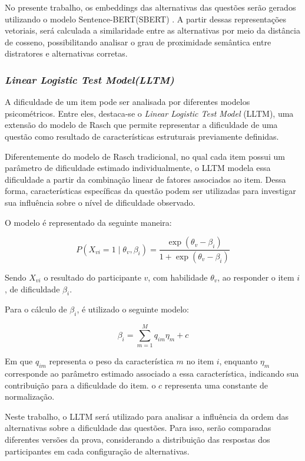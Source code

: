 \documentclass[a4paper,10pt, twocolumn]{article}
\begin{document}
No presente trabalho, os embeddings das alternativas das questões serão gerados utilizando o modelo Sentence-BERT(SBERT) \cite{reimers_sentence-bert_2019}. A partir dessas representações vetoriais, será calculada a similaridade entre as alternativas por meio da distância de cosseno, possibilitando analisar o grau de proximidade semântica entre distratores e alternativas corretas.

\subsubsection{\textit{Linear Logistic Test Model(LLTM)}}
A dificuldade de um item pode ser analisada por diferentes modelos psicométricos. Entre eles, destaca-se o \textit{Linear Logistic Test Model} (LLTM), uma extensão do modelo de Rasch que permite representar a dificuldade de uma questão como resultado de características estruturais previamente definidas. \cite{fischer_linear_1973}

Diferentemente do modelo de Rasch tradicional, no qual cada item possui um parâmetro de dificuldade estimado individualmente, o LLTM modela essa dificuldade a partir da combinação linear de fatores associados ao item. Dessa forma, características específicas da questão podem ser utilizadas para investigar sua influência sobre o nível de dificuldade observado.

O modelo é representado da seguinte maneira:

\[
P(X_{vi} = 1 \mid \theta_v, \beta_i) =
\frac{\exp(\theta_v - \beta_i)}
{1 + \exp(\theta_v - \beta_i)}
\]

Sendo $X_{vi}$ o resultado do participante $v$, com habilidade $\theta_v$, ao responder o item $i$, de dificuldade $\beta_i$.

Para o cálculo de $\beta_i$, é utilizado o seguinte modelo:

\[
\beta_i = \sum_{m=1}^{M} q_{im}\eta_m + c
\]

Em que $q_{im}$ representa o peso da característica $m$ no item $i$, enquanto $\eta_m$ corresponde ao parâmetro estimado associado a essa característica, indicando sua contribuição para a dificuldade do item. o $c$ representa uma constante de normalização. 

Neste trabalho, o LLTM será utilizado para analisar a influência da ordem das alternativas sobre a dificuldade das questões. Para isso, serão comparadas diferentes versões da prova, considerando a distribuição das respostas dos participantes em cada configuração de alternativas.
\end{document}
